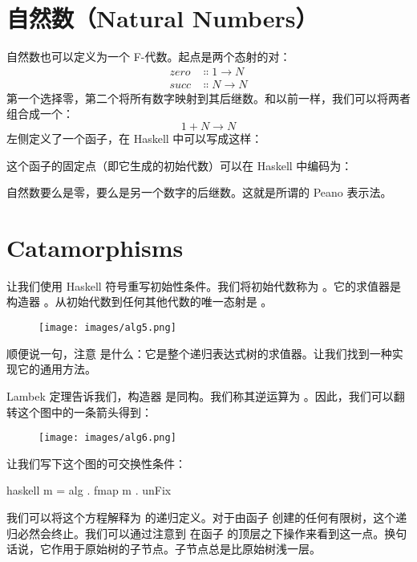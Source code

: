 \section{自然数（Natural Numbers）}

自然数也可以定义为一个 F-代数。起点是两个态射的对：
\begin{align*}
  zero & \Colon 1 \to N \\
  succ & \Colon N \to N
\end{align*}
第一个选择零，第二个将所有数字映射到其后继数。和以前一样，我们可以将两者组合成一个：
\[1 + N \to N\]
左侧定义了一个函子，在 Haskell 中可以写成这样：

这个函子的固定点（即它生成的初始代数）可以在 Haskell 中编码为：

自然数要么是零，要么是另一个数字的后继数。这就是所谓的 Peano 表示法。

\section{Catamorphisms}

让我们使用 Haskell 符号重写初始性条件。我们将初始代数称为 。它的求值器是构造器 。从初始代数到任何其他代数的唯一态射是 。

\begin{figure}[H]
  \centering
  \texttt{[image: images/alg5.png]}
\end{figure}

\noindent
顺便说一句，注意  是什么：它是整个递归表达式树的求值器。让我们找到一种实现它的通用方法。

Lambek 定理告诉我们，构造器  是同构。我们称其逆运算为 。因此，我们可以翻转这个图中的一条箭头得到：

\begin{figure}[H]
  \centering
  \texttt{[image: images/alg6.png]}
\end{figure}

\noindent
让我们写下这个图的可交换性条件：

\begin{snip}{haskell}
  m = alg . fmap m . unFix
\end{snip}
我们可以将这个方程解释为  的递归定义。对于由函子  创建的任何有限树，这个递归必然会终止。我们可以通过注意到  在函子  的顶层之下操作来看到这一点。换句话说，它作用于原始树的子节点。子节点总是比原始树浅一层。

